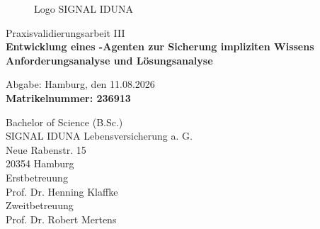 \documentclass[
  10pt,
  ngerman,
  a4paper,
  toc=graduated,
  numbers=noenddot,
  headings=standardclasses,
  nonumberlist
]{scrartcl}
\begin{document}
\hypersetup{pageanchor=false}
\thispagestyle{empty}

\vspace{1cm}

\begin{figure}[htbp]
    \centering

    \begin{minipage}[t]{0.45\textwidth}
        \raggedright
        
        \captionsetup{justification=raggedright,singlelinecheck=false}
        \caption{Logo der BHH \cite{bhh_logo}}
        \label{fig:bhh_logo}
    \end{minipage}
    \hfill
    \begin{minipage}[t]{0.45\textwidth}
        \raggedleft
        
        \captionsetup{justification=raggedleft,singlelinecheck=false}
        \caption{Logo SIGNAL IDUNA \cite{signal_iduna_logo}}
        \label{fig:signal_iduna_logo}
    \end{minipage}

\end{figure}

\vspace{1cm}
\begin{center}
	{\Large Praxisvalidierungsarbeit III} \\
	\vspace{3cm}
	{\huge \textbf{Entwicklung eines -Agenten zur Sicherung impliziten Wissens}}\\
    \vspace{0.3cm}
    {\LARGE \textbf{{Anforderungsanalyse und Lösungsanalyse}}}\\
    
\end{center}

\vspace{1.5cm}
\begin{center}
	Abgabe: Hamburg, den 11.08.2026\\[3\baselineskip]
	\textbf{\textcolor{ihk_blue}{Matrikelnummer: 236913}}

    Bachelor of Science (B.Sc.) \\[4\baselineskip]

    SIGNAL IDUNA Lebensversicherung a. G. \\
    Neue Rabenstr. 15 \\
    20354 Hamburg \\[2\baselineskip]
	
	Erstbetreuung \\
    Prof. Dr. Henning Klaffke \\[2\baselineskip]

    Zweitbetreuung \\
    Prof. Dr. Robert Mertens \\

\end{center}
\end{document}
